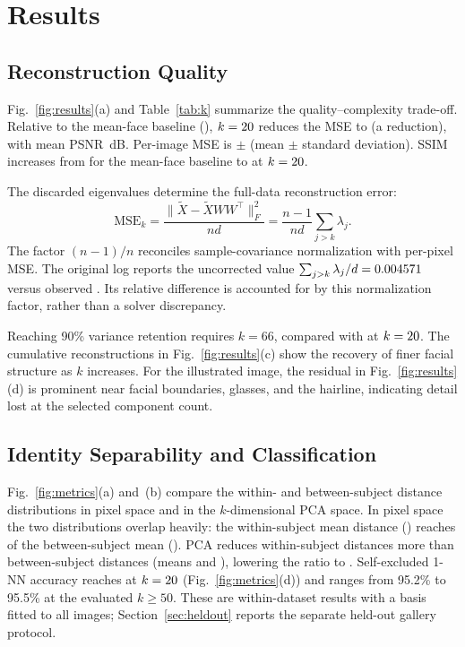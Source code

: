 \documentclass[journal]{IEEEtran}
\begin{document}
\section{Results}

\subsection{Reconstruction Quality}
Fig.~\ref{fig:results}(a) and Table~\ref{tab:k} summarize the
quality--complexity trade-off. Relative to the mean-face baseline (\nMSEBase{}), $k=20$ reduces
the MSE to \nMSEK{} (a \nDrop{} reduction), with mean PSNR
\nPSNRK{}\,dB. Per-image MSE is \nMSEK{} $\pm$ \nMSEstd{}
(mean $\pm$ standard deviation). SSIM increases from \nSsimBase{} for the
mean-face baseline to \nSsimK{} at $k=20$.

The discarded eigenvalues determine the full-data reconstruction error:
\begin{equation}
\mathrm{MSE}_k=\frac{\|\tilde X-\tilde XWW^{\!\top}\|_F^2}{nd}
=\frac{n-1}{nd}\sum_{j>k}\lambda_j.
\label{eq:mse}
\end{equation}
The factor $(n-1)/n$ reconciles sample-covariance normalization with
per-pixel MSE. The original log reports the uncorrected value
$\sum_{j>k}\lambda_j/d=0.004571{}$ versus observed \nObsK{}.
Its \nRelDev{} relative difference is accounted for by this normalization
factor, rather than a solver discrepancy.





Reaching 90\% variance retention requires $k=66$, compared with
\nVarKsSum{} at $k=20$. The cumulative reconstructions in
Fig.~\ref{fig:results}(c) show the recovery of finer facial structure as $k$
increases. For the illustrated image, the residual in
Fig.~\ref{fig:results}(d) is prominent near facial boundaries, glasses, and
the hairline, indicating detail lost at the selected component count.

\subsection{Identity Separability and Classification}
\label{sec:separation}
Fig.~\ref{fig:metrics}(a) and~(b) compare the within- and between-subject distance
distributions in pixel space and in the $k$-dimensional PCA space. In pixel
space the two distributions overlap heavily: the within-subject mean distance
(\nWithinPix{}) reaches \nSepPix{} of the between-subject mean
(\nBetweenPix{}). PCA reduces within-subject distances more than between-subject
distances (means \nWithinPCA{} and \nBetweenPCA{}), lowering the ratio to
\nSepPCA{}. Self-excluded 1-NN accuracy reaches \nAccK{} at $k=20$
(Fig.~\ref{fig:metrics}(d)) and ranges from 95.2\% to 95.5\% at the
evaluated $k\ge50$. These are within-dataset results with a basis fitted
to all images; Section~\ref{sec:heldout} reports the separate held-out
gallery protocol.
\end{document}
